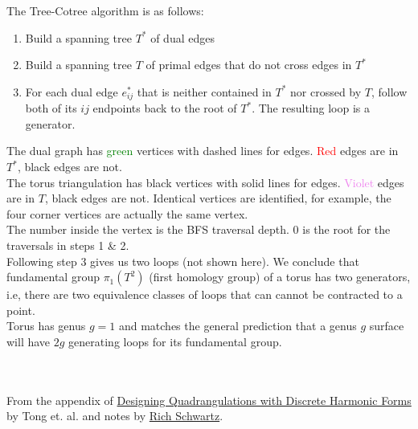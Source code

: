 \documentclass{article}
\begin{document}
The Tree-Cotree algorithm is as follows:
\begin{enumerate}
    \item Build a spanning tree $T^*$ of dual edges
    \item Build a spanning tree $T$ of primal edges that do not cross edges in $T^*$
    \item For each dual edge $e^*_{ij}$ that is neither contained in $T^*$ nor crossed by $T$, follow both of its $ij$
        endpoints back to the root of $T^*$. The resulting loop is a generator.
\end{enumerate}

\vspace{0.8cm}

The dual graph has \textcolor{green}{green} vertices with dashed lines for edges. \textcolor{red}{Red} edges are in $T^*$, 
black edges are not.\\

The torus triangulation has black vertices with solid lines for edges. \textcolor{violet}{Violet} edges are in $T$, 
black edges are not. Identical vertices are identified, for example, the four corner vertices are actually the same vertex.\\

The number inside the vertex is the BFS traversal depth. $0$ is the root for the traversals in steps 1 \& 2.\\

Following step 3 gives us two loops (not shown here). We conclude that fundamental group $\pi_1(T^2)$ (first homology group) of a torus
has two generators, i.e, there are two equivalence classes of loops that can cannot be contracted to a point.\\

Torus has genus $g=1$ and matches the general prediction that a genus $g$ surface will have $2g$ generating loops for
its fundamental group.


\pagebreak
{}\\\\

From the appendix of \href{http://geometry.caltech.edu/pubs/TACD06.pdf}{Designing Quadrangulations with Discrete Harmonic Forms}
by Tong et. al. and notes by \href{https://www.math.brown.edu/reschwar/M114/notes7.pdf}{Rich Schwartz}. \\
\end{document}
